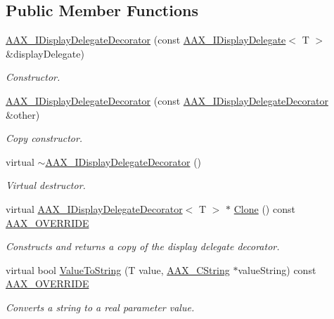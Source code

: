 \subsection*{Public Member Functions}
\begin{DoxyCompactItemize}
\item 
\hyperlink{a00094_a1e103af1eaeb6530317db4e41843c166}{A\+A\+X\+\_\+\+I\+Display\+Delegate\+Decorator} (const \hyperlink{a00092}{A\+A\+X\+\_\+\+I\+Display\+Delegate}$<$ T $>$ \&display\+Delegate)
\begin{DoxyCompactList}\small\item\em Constructor. \end{DoxyCompactList}\item 
\hyperlink{a00094_a5e3239fa6b4289dd7b3f99ce8ac1243d}{A\+A\+X\+\_\+\+I\+Display\+Delegate\+Decorator} (const \hyperlink{a00094}{A\+A\+X\+\_\+\+I\+Display\+Delegate\+Decorator} \&other)
\begin{DoxyCompactList}\small\item\em Copy constructor. \end{DoxyCompactList}\item 
virtual \hyperlink{a00094_af3b228b145dbf05de38fd3dd9bea6a16}{$\sim$\+A\+A\+X\+\_\+\+I\+Display\+Delegate\+Decorator} ()
\begin{DoxyCompactList}\small\item\em Virtual destructor. \end{DoxyCompactList}\item 
virtual \hyperlink{a00094}{A\+A\+X\+\_\+\+I\+Display\+Delegate\+Decorator}$<$ T $>$ $\ast$ \hyperlink{a00094_a8e2ad7312467089a9112ba6460fe0e5b}{Clone} () const \hyperlink{a00149_ac2f24a5172689ae684344abdcce55463}{A\+A\+X\+\_\+\+O\+V\+E\+R\+R\+I\+D\+E}
\begin{DoxyCompactList}\small\item\em Constructs and returns a copy of the display delegate decorator. \end{DoxyCompactList}\item 
virtual bool \hyperlink{a00094_ada5780cfa332ac7946bf95aa65ae96f5}{Value\+To\+String} (T value, \hyperlink{a00042}{A\+A\+X\+\_\+\+C\+String} $\ast$value\+String) const \hyperlink{a00149_ac2f24a5172689ae684344abdcce55463}{A\+A\+X\+\_\+\+O\+V\+E\+R\+R\+I\+D\+E}
\begin{DoxyCompactList}\small\item\em Converts a string to a real parameter value. \end{DoxyCompactList}\item 

\end{DoxyCompactItemize}
